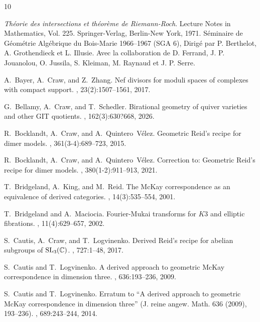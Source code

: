 \documentclass[11pt,reqno]{amsart}
\numberwithin{equation}{section}
\theoremstyle{definition}
\newcommand{\0}{\operatorname{0}}
\begin{document}
 \small{

\begin{thebibliography}{10}

{\em Th\'eorie des intersections et th\'eor\`eme de {R}iemann-{R}och}.
\newblock Lecture Notes in Mathematics, Vol. 225. Springer-Verlag, Berlin-New
  York, 1971.
\newblock S{\'e}minaire de G{\'e}om{\'e}trie Alg{\'e}brique du Bois-Marie
  1966--1967 (SGA 6), Dirig{\'e} par P. Berthelot, A. Grothendieck et L.
  Illusie. Avec la collaboration de D. Ferrand, J. P. Jouanolou, O. Jussila, S.
  Kleiman, M. Raynaud et J. P. Serre.

A.~Bayer, A.~Craw, and Z.~Zhang.
\newblock Nef divisors for moduli spaces of complexes with compact support.
, 23(2):1507--1561, 2017.

G.~Bellamy, A.~Craw, and T.~Schedler.
\newblock Birational geometry of quiver varieties and other {GIT} quotients.
, 162(3):630?668, 2026.

R.~Bocklandt, A.~Craw, and A.~Quintero~V\'{e}lez.
\newblock Geometric {R}eid's recipe for dimer models.
, 361(3-4):689--723, 2015.

R.~Bocklandt, A.~Craw, and A.~Quintero~V\'{e}lez.
\newblock Correction to: {G}eometric {R}eid's recipe for dimer models.
, 380(1-2):911--913, 2021.

T.~Bridgeland, A.~King, and M.~Reid.
\newblock The {M}c{K}ay correspondence as an equivalence of derived categories.
, 14(3):535--554, 2001.

T.~Bridgeland and A.~Maciocia.
\newblock Fourier-{M}ukai transforms for {$K3$} and elliptic fibrations.
, 11(4):629--657, 2002.

S.~Cautis, A.~Craw, and T.~Logvinenko.
\newblock Derived {R}eid's recipe for abelian subgroups of {${\rm
  SL}_3(\mathbb{C})$}.
, 727:1--48, 2017.

S.~Cautis and T.~Logvinenko.
\newblock A derived approach to geometric {M}c{K}ay correspondence in dimension
  three.
, 636:193--236, 2009.

S.~Cautis and T.~Logvinenko.
\newblock Erratum to ``{A} derived approach to geometric {M}c{K}ay
  correspondence in dimension three'' ({J}. reine angew. {M}ath. 636 (2009),
  193--236).
, 689:243--244, 2014.


\end{thebibliography}}
\end{document}

